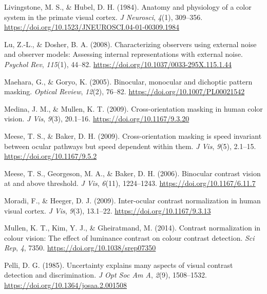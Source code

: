 \documentclass[
  letterpaper,
  DIV=11,
  numbers=noendperiod]{scrartcl}
\newlength{\cslhangindent}
\newlength{\cslentryspacingunit} %
\newenvironment{CSLReferences}[2] %
 {%
  \setlength{\parindent}{0pt}
  \ifodd #1
  \let\oldpar\par
  \def\par{\hangindent=\cslhangindent\oldpar}
  \fi
  \setlength{\parskip}{#2\cslentryspacingunit}
 }%
 {}
\begin{document}
\begin{CSLReferences}{1}{0}
\leavevmode{}%
Livingstone, M. S., \& Hubel, D. H. (1984). Anatomy and physiology of a
color system in the primate visual cortex. \emph{J Neurosci},
\emph{4}(1), 309--356.
\url{https://doi.org/10.1523/JNEUROSCI.04-01-00309.1984}

\leavevmode{}%
Lu, Z.-L., \& Dosher, B. A. (2008). Characterizing observers using
external noise and observer models: Assessing internal representations
with external noise. \emph{Psychol Rev}, \emph{115}(1), 44--82.
\url{https://doi.org/10.1037/0033-295X.115.1.44}

\leavevmode{}%
Maehara, G., \& Goryo, K. (2005). Binocular, monocular and dichoptic
pattern masking. \emph{Optical Review}, \emph{12}(2), 76--82.
\url{https://doi.org/10.1007/PL00021542}

\leavevmode{}%
Medina, J. M., \& Mullen, K. T. (2009). Cross-orientation masking in
human color vision. \emph{J Vis}, \emph{9}(3), 20.1--16.
\url{https://doi.org/10.1167/9.3.20}

\leavevmode{}%
Meese, T. S., \& Baker, D. H. (2009). Cross-orientation masking is speed
invariant between ocular pathways but speed dependent within them.
\emph{J Vis}, \emph{9}(5), 2.1--15. \url{https://doi.org/10.1167/9.5.2}

\leavevmode{}%
Meese, T. S., Georgeson, M. A., \& Baker, D. H. (2006). Binocular
contrast vision at and above threshold. \emph{J Vis}, \emph{6}(11),
1224--1243. \url{https://doi.org/10.1167/6.11.7}

\leavevmode{}%
Moradi, F., \& Heeger, D. J. (2009). Inter-ocular contrast normalization
in human visual cortex. \emph{J Vis}, \emph{9}(3), 13.1--22.
\url{https://doi.org/10.1167/9.3.13}

\leavevmode{}%
Mullen, K. T., Kim, Y. J., \& Gheiratmand, M. (2014). Contrast
normalization in colour vision: The effect of luminance contrast on
colour contrast detection. \emph{Sci Rep}, \emph{4}, 7350.
\url{https://doi.org/10.1038/srep07350}

\leavevmode{}%
Pelli, D. G. (1985). Uncertainty explains many aspects of visual
contrast detection and discrimination. \emph{J Opt Soc Am A},
\emph{2}(9), 1508--1532. \url{https://doi.org/10.1364/josaa.2.001508}


\end{CSLReferences}
\end{document}
